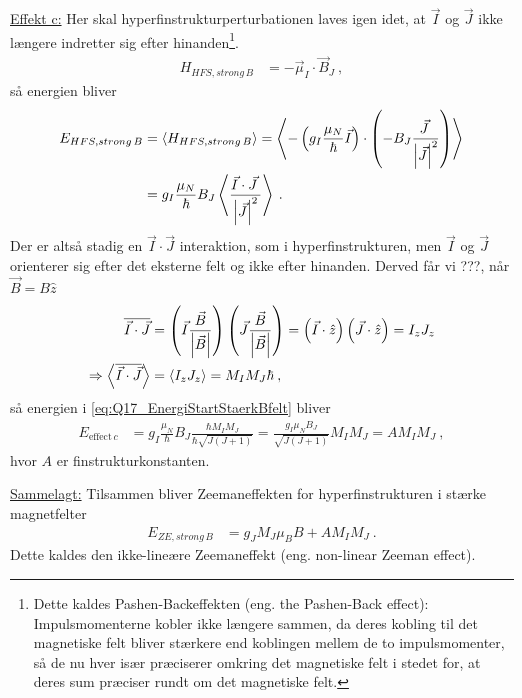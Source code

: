 \noindent\underline{Effekt c:} Her skal hyperfinstrukturperturbationen laves igen idet, at $\Vec{I}$ og $\Vec{J}$ ikke længere indretter sig efter hinanden\footnote{Dette kaldes Pashen-Backeffekten (eng. the Pashen-Back effect): Impulsmomenterne kobler ikke længere sammen, da deres kobling til det magnetiske felt bliver stærkere end koblingen mellem de to impulsmomenter, så de nu hver især præciserer omkring det magnetiske felt i stedet for, at deres sum præciser rundt om det magnetiske felt.}.
\begin{align}
    H_{HFS,strong\,B} &= - \Vec{\mu}_I \cdot \Vec{B}_J \: ,
\end{align}
så energien bliver
\begin{align} \label{eq:Q17_EnergiStartStaerkBfelt}
    E_{HFS,strong\,B} &= \Braket{H_{HFS,strong\,B}} = \Braket{- \left(g_I \frac{\mu_N}{\hbar}\Vec{I}\right) \cdot \left(- B_J\frac{\Vec{J} \:}{\abs{\Vec{J}}^2}\right)} \nonumber\\
    &= g_I \frac{\mu_N}{\hbar}B_J \Braket{\frac{\Vec{I} \cdot \Vec{J} \:}{\abs{\Vec{J}}^2}} \: .
\end{align}
Der er altså stadig en $\Vec{I} \cdot \Vec{J}$ interaktion, som i hyperfinstrukturen, men $\Vec{I}$ og $\Vec{J}$ orienterer sig efter det eksterne felt og ikke efter hinanden. Derved får vi ???, når $\Vec{B} = B \hat{z}$
\begin{align}
    \overline{\Vec{I} \cdot \Vec{J}} &= \left(\Vec{I}\frac{\Vec{B}}{\abs{\Vec{B}}}\right)\left(\Vec{J}\frac{\Vec{B}}{\abs{\Vec{B}}}\right) = \left(\Vec{I} \cdot \hat{z}\right)\left(\Vec{J} \cdot \hat{z}\right) = I_z J_z \\
    \Rightarrow \Braket{\overline{\Vec{I} \cdot \Vec{J}}} &= \Braket{I_z J_z} = M_I M_J \hbar \: ,
\end{align}
så energien i \cref{eq:Q17_EnergiStartStaerkBfelt} bliver
\begin{align} \label{eq:Q17_EnergyFromEffectC}
    E_{\text{effect}\,c} &= g_I \frac{\mu_N}{\hbar}B_J \frac{\hbar M_I M_J}{\hbar \sqrt{J(J+1)}} = \frac{g_I \mu_N B_J}{\sqrt{J(J+1)}} M_I M_J = A M_I M_J \: ,
\end{align}
hvor $A$ er finstrukturkonstanten.

\noindent\underline{Sammelagt:} Tilsammen bliver Zeemaneffekten for hyperfinstrukturen i stærke magnetfelter
\begin{align} \label{eq:EnergiskiftZeemanIHyperfinstrukturStarktFelt}
    E_{ZE,strong\,B} &= g_J M_J \mu_B B + A M_I M_J \: .
\end{align}
Dette kaldes den \textsf{ikke-lineære Zeemaneffekt} (eng. non-linear Zeeman effect).


